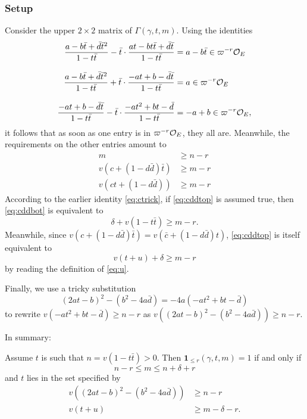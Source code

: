 \subsubsection{Setup}
Consider the upper $2 \times 2$ matrix of $\Gamma(\gamma, t, m)$.
Using the identities
\begin{align*}
  \dfrac{a-b\bar t+\bar d \bar t^2}{1-t \bar t}
    - \bar t \cdot \dfrac{at-bt\bar t+\bar d \bar t}{1-t \bar t}
    &= a-b\bar t \in \varpi^{-r} \mathcal O_E \\[2ex]
  \dfrac{a-b\bar t+\bar d \bar t^2}{1-t \bar t}
    + \bar t \cdot \dfrac{-at+b-\bar d \bar t}{1-t \bar t}
    &= a \in \varpi^{-r} \mathcal O_E \\[2ex]
  \dfrac{-at+b-\bar d \bar t}{1-t \bar t}
    - \bar t \cdot \dfrac{-at^2+bt-\bar d}{1-t \bar t}
    &= -a+b \in \varpi^{-r} \mathcal O_E,
\end{align*}
it follows that as soon as one entry is in $\varpi^{-r} \mathcal O_E$, they all are.
Meanwhile, the requirements on the other entries amount to
\begin{align}
  m & \geq n - r \\
  v\left( c+(1-d \bar d) \bar t \right) &\geq m-r \label{eq:cddtop} \\
  v\left( ct+(1-d \bar d) \right) &\geq m-r \label{eq:cddbot}
\end{align}
According to the earlier identity \eqref{eq:ctrick},
if \eqref{eq:cddtop} is assumed true,
then \eqref{eq:cddbot} is equivalent to
\[ \delta + v(1-t \bar t) \ge m-r. \]
Meanwhile, since $v(c+(1-d \bar d) \bar t) = v(\bar c + (1-d \bar d)t)$,
\eqref{eq:cddtop} is itself equivalent to
\[ v(t+u) + \delta \geq m-r \]
by reading the definition of \eqref{eq:u}.

Finally, we use a tricky substitution
\[ (2at-b)^2 - (b^2-4a\bar d) = -4a(-at^2+bt-\bar d) \]
to rewrite $v(-at^2+bt-\bar d) \geq n-r$
as $v\left( (2at-b)^2 - (b^2-4a\bar d) \right) \geq n-r$.

In summary:
\begin{claim}
  Assume $t$ is such that $n = v(1-t \bar t) > 0$.
  Then $\mathbf{1}_{\le r}(\gamma, t, m) = 1$ if and only if
  \[ n - r \leq m \leq n + \delta + r \]
  and $t$ lies in the set specified by
  \begin{align*}
    v\left( (2at-b)^2 - (b^2-4a\bar d) \right) &\geq n-r \\
    v(t+u) &\ge m-\delta-r.
  \end{align*}
\end{claim}

